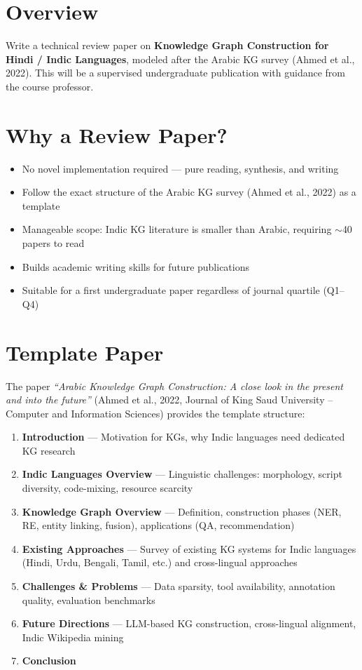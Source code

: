 \section{Overview}
\label{sec:phase2}

Write a technical review paper on \textbf{Knowledge Graph Construction for Hindi / Indic Languages}, modeled after the Arabic KG survey (Ahmed et al., 2022). This will be a supervised undergraduate publication with guidance from the course professor.

\section{Why a Review Paper?}

\begin{itemize}[nosep]
    \item No novel implementation required --- pure reading, synthesis, and writing
    \item Follow the exact structure of the Arabic KG survey (Ahmed et al., 2022) as a template
    \item Manageable scope: Indic KG literature is smaller than Arabic, requiring $\sim$40 papers to read
    \item Builds academic writing skills for future publications
    \item Suitable for a first undergraduate paper regardless of journal quartile (Q1--Q4)
\end{itemize}

\section{Template Paper}

The paper \textit{``Arabic Knowledge Graph Construction: A close look in the present and into the future''} (Ahmed et al., 2022, Journal of King Saud University -- Computer and Information Sciences) provides the template structure:

\begin{enumerate}[nosep]
    \item \textbf{Introduction} --- Motivation for KGs, why Indic languages need dedicated KG research
    \item \textbf{Indic Languages Overview} --- Linguistic challenges: morphology, script diversity, code-mixing, resource scarcity
    \item \textbf{Knowledge Graph Overview} --- Definition, construction phases (NER, RE, entity linking, fusion), applications (QA, recommendation)
    \item \textbf{Existing Approaches} --- Survey of existing KG systems for Indic languages (Hindi, Urdu, Bengali, Tamil, etc.) and cross-lingual approaches
    \item \textbf{Challenges \& Problems} --- Data sparsity, tool availability, annotation quality, evaluation benchmarks
    \item \textbf{Future Directions} --- LLM-based KG construction, cross-lingual alignment, Indic Wikipedia mining
    \item \textbf{Conclusion}
\end{enumerate}


